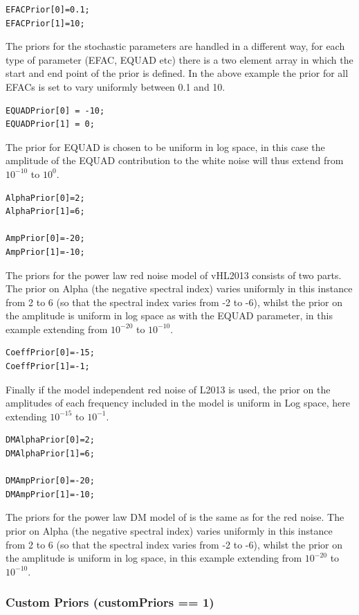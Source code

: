 \documentclass[%
 preprint,
 amsmath,amssymb,amsfonts,
 aps,
]{revtex4-1}
\begin{document}
\begin{lstlisting}
EFACPrior[0]=0.1;
EFACPrior[1]=10;
\end{lstlisting}

The priors for the stochastic parameters are handled in a different way, for each type of parameter (EFAC, EQUAD etc) there is a two element array in which the start and end point of the prior is defined.  In the above example the prior for all EFACs is set to vary uniformly between 0.1 and 10.  
%
\begin{lstlisting}
EQUADPrior[0] = -10;
EQUADPrior[1] = 0;
\end{lstlisting}

The prior for EQUAD is chosen to be uniform in log space, in this case the amplitude of the EQUAD contribution to the white noise will thus extend from $10^{-10}$ to $10^0$. 

\begin{lstlisting}
AlphaPrior[0]=2;
AlphaPrior[1]=6;

AmpPrior[0]=-20;
AmpPrior[1]=-10;
\end{lstlisting}
%
The priors for the power law red noise model of vHL2013 consists of two parts.  The prior on Alpha (the negative spectral index) varies uniformly in this instance from 2 to 6 (so that the spectral index varies from -2 to -6), whilst the prior on the amplitude is uniform in log space as with the EQUAD parameter, in this example extending from $10^{-20}$ to $10^{-10}$.
%

\begin{lstlisting}
CoeffPrior[0]=-15;
CoeffPrior[1]=-1;
\end{lstlisting}

Finally if the model independent red noise of L2013 is used, the prior on the amplitudes of each frequency included in the model is uniform in Log space, here extending $10^{-15}$ to $10^{-1}$.

\begin{lstlisting}
DMAlphaPrior[0]=2;
DMAlphaPrior[1]=6;

DMAmpPrior[0]=-20;
DMAmpPrior[1]=-10;
\end{lstlisting}
%
The priors for the power law DM model of is the same as for the red noise.  The prior on Alpha (the negative spectral index) varies uniformly in this instance from 2 to 6 (so that the spectral index varies from -2 to -6), whilst the prior on the amplitude is uniform in log space, in this example extending from $10^{-20}$ to $10^{-10}$.
%

\subsubsection{Custom Priors (customPriors == 1)}
\label{Section:customPriors}
\end{document}

